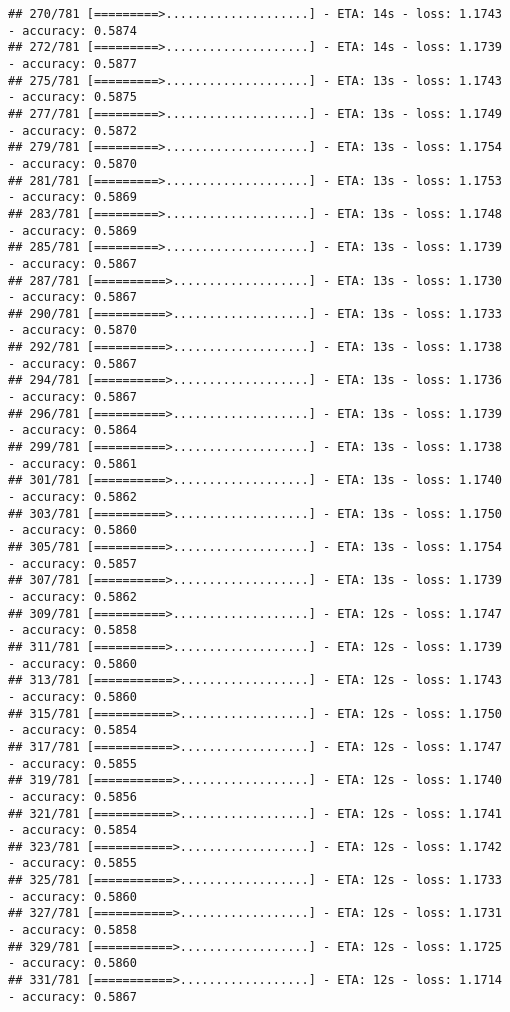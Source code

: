 \documentclass[
]{article}
\begin{document}
\begin{verbatim}
## 270/781 [=========>....................] - ETA: 14s - loss: 1.1743 - accuracy: 0.5874
## 272/781 [=========>....................] - ETA: 14s - loss: 1.1739 - accuracy: 0.5877
## 275/781 [=========>....................] - ETA: 13s - loss: 1.1743 - accuracy: 0.5875
## 277/781 [=========>....................] - ETA: 13s - loss: 1.1749 - accuracy: 0.5872
## 279/781 [=========>....................] - ETA: 13s - loss: 1.1754 - accuracy: 0.5870
## 281/781 [=========>....................] - ETA: 13s - loss: 1.1753 - accuracy: 0.5869
## 283/781 [=========>....................] - ETA: 13s - loss: 1.1748 - accuracy: 0.5869
## 285/781 [=========>....................] - ETA: 13s - loss: 1.1739 - accuracy: 0.5867
## 287/781 [==========>...................] - ETA: 13s - loss: 1.1730 - accuracy: 0.5867
## 290/781 [==========>...................] - ETA: 13s - loss: 1.1733 - accuracy: 0.5870
## 292/781 [==========>...................] - ETA: 13s - loss: 1.1738 - accuracy: 0.5867
## 294/781 [==========>...................] - ETA: 13s - loss: 1.1736 - accuracy: 0.5867
## 296/781 [==========>...................] - ETA: 13s - loss: 1.1739 - accuracy: 0.5864
## 299/781 [==========>...................] - ETA: 13s - loss: 1.1738 - accuracy: 0.5861
## 301/781 [==========>...................] - ETA: 13s - loss: 1.1740 - accuracy: 0.5862
## 303/781 [==========>...................] - ETA: 13s - loss: 1.1750 - accuracy: 0.5860
## 305/781 [==========>...................] - ETA: 13s - loss: 1.1754 - accuracy: 0.5857
## 307/781 [==========>...................] - ETA: 13s - loss: 1.1739 - accuracy: 0.5862
## 309/781 [==========>...................] - ETA: 12s - loss: 1.1747 - accuracy: 0.5858
## 311/781 [==========>...................] - ETA: 12s - loss: 1.1739 - accuracy: 0.5860
## 313/781 [===========>..................] - ETA: 12s - loss: 1.1743 - accuracy: 0.5860
## 315/781 [===========>..................] - ETA: 12s - loss: 1.1750 - accuracy: 0.5854
## 317/781 [===========>..................] - ETA: 12s - loss: 1.1747 - accuracy: 0.5855
## 319/781 [===========>..................] - ETA: 12s - loss: 1.1740 - accuracy: 0.5856
## 321/781 [===========>..................] - ETA: 12s - loss: 1.1741 - accuracy: 0.5854
## 323/781 [===========>..................] - ETA: 12s - loss: 1.1742 - accuracy: 0.5855
## 325/781 [===========>..................] - ETA: 12s - loss: 1.1733 - accuracy: 0.5860
## 327/781 [===========>..................] - ETA: 12s - loss: 1.1731 - accuracy: 0.5858
## 329/781 [===========>..................] - ETA: 12s - loss: 1.1725 - accuracy: 0.5860
## 331/781 [===========>..................] - ETA: 12s - loss: 1.1714 - accuracy: 0.5867

\end{verbatim}
\end{document}
